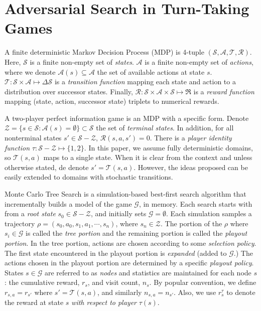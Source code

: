 \documentclass[letterpaper]{article}
\newcommand{\cA}{\mathcal{A}}
\newcommand{\cG}{\mathcal{G}}
\newcommand{\cR}{\mathcal{R}}
\newcommand{\cS}{\mathcal{S}}
\newcommand{\cT}{\mathcal{T}}
\newcommand{\cZ}{\mathcal{Z}}
\begin{document}
\section{Adversarial Search in Turn-Taking Games}


A finite deterministic Markov Decision Process (MDP) is 4-tuple $(\cS, \cA, \cT, \cR)$. Here, $\cS$ is a finite non-empty set of {\it states}. 
$\cA$ is a finite non-empty set of {\it actions}, where we denote $\cA(s) \subseteq \cA$ the set of available actions at state $s$. 
$\cT : \cS \times \cA \mapsto \Delta \cS$ is a {\it transition function} mapping 
each state and action to a distribution over successor states. Finally, $\cR : \cS \times \cA \times \cS \mapsto \Re$ 
is a {\it reward function} mapping (state, action, successor state) triplets to numerical rewards. 

A two-player perfect information game is an MDP with a specific form. 
Denote $\cZ = \{ s \in \cS: \cA(s) = \emptyset \} \subset \cS$ the set of {\it terminal states}. 
In addition, for all nonterminal states $s' \in \cS - \cZ$, $\cR(s,a,s') = 0$. 
There is a {\it player identity function} $\tau : \cS - \cZ \mapsto \{1,2\}$. 
In this paper, we assume fully deterministic domains, so $\cT(s,a)$ maps to a single state. 
When it is clear from the context and unless otherwise stated, de denote $s' = \cT(s,a)$. 
However, the ideas proposed can be easily extended to domains with stochastic transitions. 

Monte Carlo Tree Search is a simulation-based best-first search algorithm that incrementally builds a model of the game 
$\cG$, in memory. Each search starts with from a {\it root state} $s_0 \in \cS - \cZ$, and initially sets $\cG = \emptyset$. 
Each simulation samples a trajectory $\rho = (s_0, a_0, s_1, a_1, \cdots, s_n)$, where $s_n \in \cZ$. 
The portion of the $\rho$ where $s_i \in \cG$ is called the {\it tree portion} and the remaining portion is
called the {\it playout portion}. In the tree portion, actions are chosen according to some {\it selection policy}. 
The first state encountered in the playout portion is {\it expanded} (added to $\cG$.) 
The actions chosen in the playout portion are determined by a specific {\it playout policy}. 
States $s \in \cG$ are referred to as {\it nodes} and statistics are  
maintained for each node $s$: the cumulative reward, $r_s$, and visit count, $n_s$. 
By popular convention, we define $r_{s,a} = r_{s'}$ where $s' = \cT(s,a)$, and similarly $n_{s,a} = n_{s'}$. 
Also, we use $r^{\tau}_s$ to denote the reward at state $s$ {\it with respect to player} $\tau(s)$. 
\end{document}

